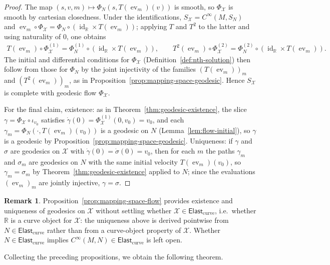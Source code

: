 \documentclass{amsart}
\newcommand{\R}{\mathbb{R}}
\newcommand{\X}{\mathcal{X}}
\DeclareMathOperator{\id}{id}
\DeclareMathOperator{\evl}{ev}
\theoremstyle{definition}
\newtheorem{rem}[thm]{Remark}
\begin{document}
\begin{proof}
  The map $(s, v, m) \mapsto \Phi_N(s, T(\evl_m)(v))$ is smooth, so
  $\Phi_{\X}$ is smooth by cartesian closedness. Under the identifications,
  $S_{\X} = C^\infty(M, S_N)$ and
  $\evl_m \circ \Phi_{\X} = \Phi_N \circ (\id_\R \times T(\evl_m))$;
  applying $T$ and $T^2$ to the latter and using naturality of $0$, one
  obtains
  \begin{align*}
    T(\evl_m) \circ \Phi_{\X}^{(1)}
      = \Phi_N^{(1)} \circ (\id_\R \times T(\evl_m)),
    \qquad
    T^2(\evl_m) \circ \Phi_{\X}^{(2)}
      = \Phi_N^{(2)} \circ (\id_\R \times T(\evl_m)).
  \end{align*}
  The initial and differential conditions for $\Phi_{\X}$
  (Definition~\ref{def:nth-solution}) then follow from those for $\Phi_N$ by
  the joint injectivity of the families $(T(\evl_m))_m$ and
  $(T^2(\evl_m))_m$, as in Proposition~\ref{prop:mapping-space-geodesic}.
  Hence $S_{\X}$ is complete with geodesic flow $\Phi_{\X}$.

  For the final claim, existence: as in
  Theorem~\ref{thm:geodesic-existence}, the slice
  $\gamma = \Phi_{\X} \circ \iota_{v_0}$ satisfies
  $\dot\gamma(0) = \Phi_{\X}^{(1)}(0, v_0) = v_0$, and each
  $\gamma_m = \Phi_N(\cdot, T(\evl_m)(v_0))$ is a geodesic on $N$
  (Lemma~\ref{lem:flow-initial}), so $\gamma$ is a geodesic by
  Proposition~\ref{prop:mapping-space-geodesic}. Uniqueness: if $\gamma$ and
  $\sigma$ are geodesics on $\X$ with
  $\dot\gamma(0) = \dot\sigma(0) = v_0$, then for each $m$ the paths
  $\gamma_m$ and $\sigma_m$ are geodesics on $N$ with the same initial
  velocity $T(\evl_m)(v_0)$, so $\gamma_m = \sigma_m$ by
  Theorem~\ref{thm:geodesic-existence} applied to $N$; since the
  evaluations $(\evl_m)_m$ are jointly injective, $\gamma = \sigma$.
\end{proof}

\begin{rem}\label{rem:mapping-space-lc-membership}
  Proposition~\ref{prop:mapping-space-flow} provides existence and uniqueness
  of geodesics on $\X$ without settling whether
  $\X \in \mathsf{Elast}_{\mathrm{curve}}$, i.e.\ whether $\R$ is a curve object
  for $\X$: the uniqueness above is derived pointwise from
  $N \in \mathsf{Elast}_{\mathrm{curve}}$ rather than from a curve-object
  property of $\X$. Whether $N \in \mathsf{Elast}_{\mathrm{curve}}$ implies
  $C^\infty(M, N) \in \mathsf{Elast}_{\mathrm{curve}}$ is left open.
\end{rem}

Collecting the preceding propositions, we obtain the following theorem.
\end{document}
